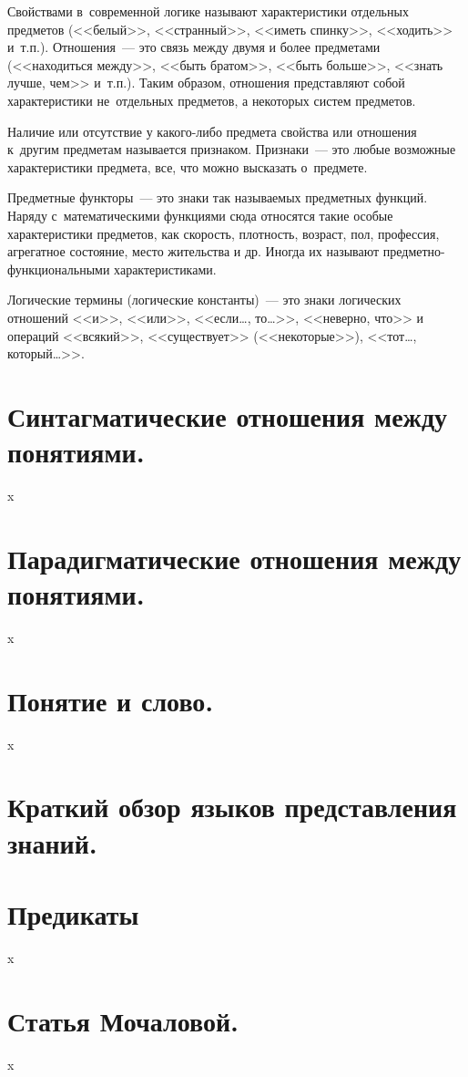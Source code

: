 \documentclass[12pt]{article}
\theoremstyle{definition}
\theoremstyle{remark}
\numberwithin{equation}{section}
\begin{document}
Свойствами в~современной логике называют характеристики отдельных предметов 
(<<белый>>, <<странный>>, <<иметь спинку>>, <<ходить>> и~т.п.). 
Отношения~--- это связь между двумя и более предметами (<<находиться 
между>>, <<быть братом>>, <<быть больше>>, <<знать лучше, чем>> и~т.п.). 
Таким образом, отношения представляют собой характеристики не~отдельных 
предметов, а некоторых систем предметов.

Наличие или отсутствие у какого-либо предмета свойства или отношения 
к~другим предметам называется признаком. Признаки~--- это любые возможные 
характеристики предмета, все, что можно высказать о~предмете.

Предметные функторы~--- это знаки так называемых предметных функций. 
Наряду с~математическими функциями сюда относятся такие особые 
характеристики предметов, как скорость, плотность, возраст, пол, 
профессия, агрегатное состояние, место жительства и др. 
Иногда их называют предметно-функциональными характеристиками.

Логические термины (логические константы)~--- это знаки логических 
отношений <<и>>, <<или>>, <<если\dots, то\dots>>, <<неверно, что>> 
и операций <<всякий>>, <<существует>> (<<некоторые>>), <<тот…, который…>>.

\section{Синтагматические отношения между понятиями.}
x
\section{Парадигматические отношения между понятиями.}
x
\section{Понятие и слово.}
x
\section{Краткий обзор языков представления знаний.}

\section{Предикаты}
x
\section{Статья Мочаловой.}
x
\end{document}
